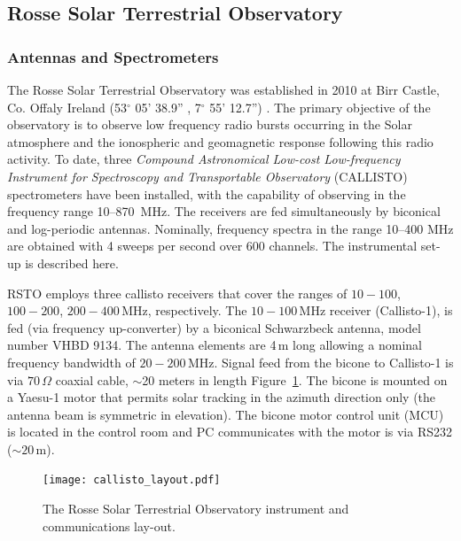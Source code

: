 \subsection{Rosse Solar Terrestrial Observatory}\label{sec:30}

\subsubsection{Antennas and Spectrometers}
The Rosse Solar Terrestrial Observatory was established in 2010 at Birr Castle, Co. Offaly Ireland (53$^{\circ}$ 05' 38.9'' , 7$^{\circ}$ 55' 12.7'') \citep{zucca2012}. The primary objective of the observatory is to observe low frequency radio bursts occurring in the Solar atmosphere and the ionospheric and geomagnetic response following this radio activity.  To date, three \textit{Compound Astronomical Low-cost Low-frequency Instrument for Spectroscopy and Transportable Observatory} (CALLISTO) spectrometers have been installed, with the capability of observing in the frequency range 10--870~MHz. The receivers are fed simultaneously by biconical and log-periodic antennas. Nominally, frequency spectra in the range 10--400 MHz are obtained with 4 sweeps per second over 600 channels. The instrumental set-up is described here.

RSTO employs three callisto receivers that cover the ranges of $10-100$, $100-200$, $200-400$\,MHz, respectively. The $10-100$\,MHz receiver (Callisto-1), is fed (via frequency up-converter) by a biconical Schwarzbeck antenna, model number VHBD 9134. The antenna elements are 4\,m long allowing a nominal frequency bandwidth of $20-200$\,MHz. Signal feed from the bicone to Callisto-1 is via $70\,\Omega$ coaxial cable, $\sim$20 meters in length Figure~\ref{fig:rsto_layout}. The bicone is mounted on a Yaesu-1 motor that permits solar tracking in the azimuth direction only (the antenna beam is symmetric in elevation). The bicone motor control unit (MCU) is located in the control room and PC communicates with the motor is via RS232 ($\sim20$\,m).
\begin{figure}
    \centering
\texttt{[image: callisto\_layout.pdf]}
\caption[RSTO Instrumental Setup]{The Rosse Solar Terrestrial Observatory instrument and communications lay-out.}
\label{fig:rsto_layout}
\end{figure}

